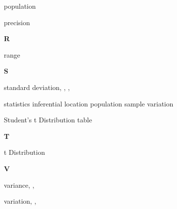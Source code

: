 \begin{theindex}
  \item population\dotfill {}
  \item precision\dotfill {}

  \indexspace

{\Large\textbf
R
}\hfill\nopagebreak

  \item range\dotfill {}

  \indexspace

{\Large\textbf
S
}\hfill\nopagebreak

  \item standard deviation\dotfill {}, , 
		, 
  \item statistics
    \subitem inferential\dotfill {}
    \subitem location\dotfill {}
    \subitem population\dotfill {}
    \subitem sample\dotfill {}
    \subitem variation\dotfill {}
  \item Student's t Distribution
    \subitem table\dotfill {}

  \indexspace

{\Large\textbf
T
}\hfill\nopagebreak

  \item t Distribution\dotfill {}

  \indexspace

{\Large\textbf
V
}\hfill\nopagebreak

  \item variance\dotfill {}, , 
  \item variation\dotfill {}, , 

\end{theindex}
